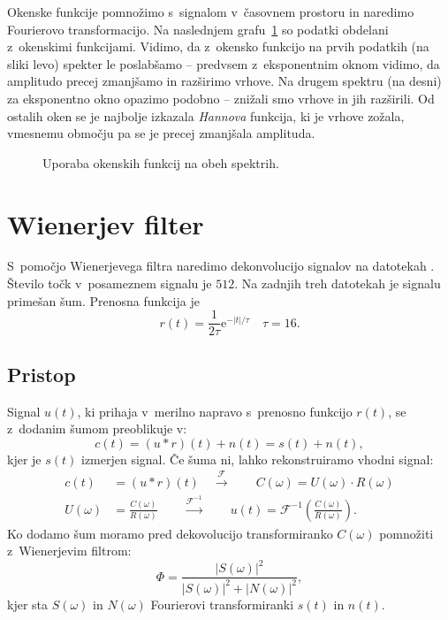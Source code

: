 \documentclass[a4paper,pdftex,10pt]{article}
\numberwithin{figure}{section} %
\begin{document}
Okenske funkcije pomnožimo s~signalom v~časovnem prostoru in naredimo Fourierovo 
transformacijo. Na naslednjem grafu~\ref{slika5} so podatki obdelani z~okenskimi funkcijami.
Vidimo, da z~okensko funkcijo na prvih podatkih (na sliki levo) spekter le poslabšamo --
predvsem z~eksponentnim oknom vidimo, da amplitudo precej zmanjšamo in razširimo vrhove.
Na drugem spektru (na desni) za eksponentno okno opazimo podobno -- znižali smo vrhove in
jih razširili. Od ostalih oken se je najbolje izkazala \emph{Hannova} funkcija, ki je
vrhove zožala, vmesnemu območju pa se je precej zmanjšala amplituda.
\begin{figure}[H]
    \centering
    \resizebox{0.49\linewidth}{!}{}
    \resizebox{0.49\linewidth}{!}{}
    \caption{Uporaba okenskih funkcij na obeh spektrih.}
    \label{slika5}
\end{figure}

\pagebreak

\section{Wienerjev filter}
S~pomočjo Wienerjevega filtra naredimo dekonvolucijo signalov na datotekah 
. Število točk v~posameznem signalu je $512$. Na zadnjih treh 
datotekah je signalu primešan šum. Prenosna funkcija je
\begin{equation}
    r(t) = \frac{1}{2\tau} \mathrm{e}^{- |t|/\tau} \quad \tau=16.
\end{equation}
\subsection{Pristop}
Signal $u(t)$, ki prihaja v~merilno napravo s~prenosno funkcijo $r(t)$, se z~dodanim šumom
preoblikuje v:
\begin{equation}
    c(t) = (u*r)(t) + n(t) = s(t) + n(t),
\end{equation}
kjer je $s(t)$ izmerjen signal. Če šuma ni, lahko rekonstruiramo vhodni signal:
\begin{align}
    c(t) &= (u*r)(t) \quad 
    \xrightarrow{\mathcal{F}} \qquad 
    C(\omega) = U(\omega) \cdot R(\omega) \\
    U(\omega) &= \frac{C(\omega)}{R(\omega)} \qquad 
    \xrightarrow{\mathcal{F}^{-1}} \qquad 
    u(t) = \mathcal{F}^{-1}\left(\frac{C(\omega)}{R(\omega)}\right).
\end{align}
Ko dodamo šum moramo pred dekovolucijo transformiranko $C(\omega)$ pomnožiti z~Wienerjevim
filtrom:
\begin{equation}
    \Phi = \frac{|S(\omega)|^2}{|S(\omega)|^2 + |N(\omega)|^2},
\end{equation}
kjer sta $S(\omega)$ in $N(\omega)$ Fourierovi transformiranki $s(t)$ in $n(t)$.
\end{document}
